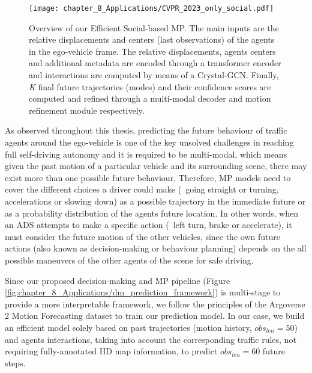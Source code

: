 \begin{figure}[h]
	\centering
	\setlength{\tabcolsep}{2.0pt}
	\texttt{[image: chapter\_8\_Applications/CVPR\_2023\_only\_social.pdf]}
	\captionsetup{justification=justified}
	\caption[Overview of our Efficient Social-based \ac{MP}]{Overview of our Efficient Social-based \ac{MP}. The main inputs are the relative displacements and centers (last observations) of the agents in the ego-vehicle frame. The relative displacements, agents centers and additional metadata are encoded through a transformer encoder and interactions are computed by means of a Crystal-\ac{GCN}. Finally, \textit{K} final future trajectories (modes) and their confidence scores are computed and refined through a multi-modal decoder and motion refinement module respectively.}
	
	\label{fig:chapter_8_Applications/CVPR_2023_only_social}
\end{figure}

As observed throughout this thesis, predicting the future behaviour of traffic agents around the ego-vehicle is one of the key unsolved challenges in reaching full self-driving autonomy and it is required to be multi-modal, which means given the past motion of a particular vehicle and its surrounding scene, there may exist more than one possible future behaviour. Therefore, MP models need to cover the different choices a driver could make (\ie \ going straight or turning, accelerations or slowing down) as a possible trajectory in the immediate future or as a probability distribution of the agents future location. In other words, when an \ac{ADS} attempts to make a specific action (\eg \ left turn, brake or accelerate), it must consider the future motion of the other vehicles, since the own future actions (also known as decision-making or behaviour planning) depends on the all possible maneuvers of the other agents of the scene for safe driving. %

Since our proposed decision-making and \ac{MP} pipeline (Figure \ref{fig:chapter_8_Applications/dm_prediction_framework}) is multi-stage to provide a more interpretable framework, we follow the principles of the Argoverse 2 Motion Forecasting dataset \cite{wilson2023argoverse} to train our prediction model. In our case, we build an efficient model solely based on past trajectories (motion history, $obs_{len} = 50$) and agents interactions, taking into account the corresponding traffic rules, not requiring fully-annotated HD map information, to predict $obs_{len} = 60$ future steps. %

